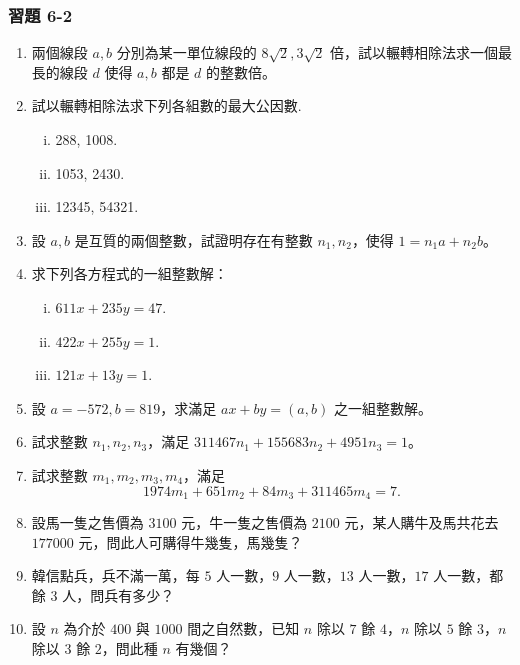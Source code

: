\subsubsection*{習題 6-2}\label{sec:ex6-2}

\begin{enumerate}[1.]
  \item 兩個線段 $a, b$ 分別為某一單位線段的 $8\sqrt{2}, 3\sqrt{2}$ 倍，試以輾轉相除法求一個最長的線段 $d$ 使得 $a, b$ 都是 $d$ 的整數倍。

  \item 試以輾轉相除法求下列各組數的最大公因數.
  \begin{enumerate}[(i)]
    \item 288, 1008.
    \item 1053, 2430.
    \item 12345, 54321.
  \end{enumerate}

  \item 設 $a, b$ 是互質的兩個整數，試證明存在有整數 $n_1, n_2$，使得 $1 = n_1 a + n_2 b$。

  \item 求下列各方程式的一組整數解：
  \begin{enumerate}[(i)]
    \item $611x + 235y = 47$.
    \item $422x + 255y = 1$.
    \item $121x + 13y = 1$.
  \end{enumerate}

  \item 設 $a=-572, b=819$，求滿足 $ax+by=(a, b)$ 之一組整數解。

  \item 試求整數 $n_1, n_2, n_3$，滿足 $311467n_1 + 155683n_2 + 4951n_3 = 1$。

  \item 試求整數 $m_1, m_2, m_3, m_4$，滿足
  \begin{equation*}
    1974m_1 + 651m_2 + 84m_3 + 311465m_4 = 7.
  \end{equation*}

  \item 設馬一隻之售價為 $3100$ 元，牛一隻之售價為 $2100$ 元，某人購牛及馬共花去 $177000$ 元，問此人可購得牛幾隻，馬幾隻？

  \item 韓信點兵，兵不滿一萬，每 $5$ 人一數，$9$ 人一數，$13$ 人一數，$17$ 人一數，都餘 $3$ 人，問兵有多少？

  \item 設 $n$ 為介於 $400$ 與 $1000$ 間之自然數，已知 $n$ 除以 $7$ 餘 $4$，$n$ 除以 $5$ 餘 $3$，$n$ 除以 $3$ 餘 $2$，問此種 $n$ 有幾個？


\end{enumerate}
